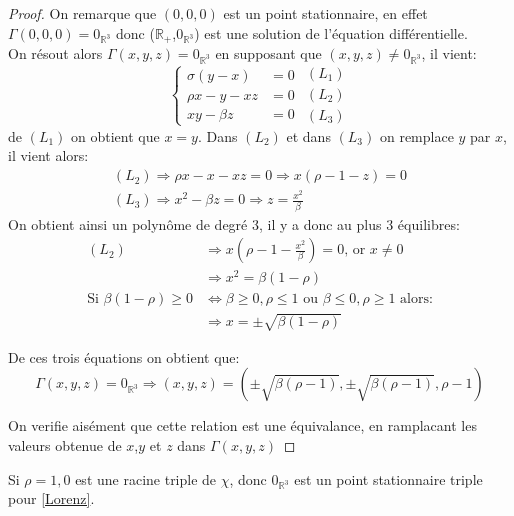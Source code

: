 \documentclass{article}
\newcommand{\R}{\mathbb{R}}
\newtheorem[M , nocut]{prop}{Proposition}[section]
\newtheorem[M , nocut]{definition}{Définition}
\newtheorem[M , nocut]{lemme}{Lemme}
\newtheorem[L , nocut]{thm}{Théoreme}
\newtheorem[M , nocut]{cor}{Corollaire}
\begin{document}
\begin{proof}
On remarque que $(0,0,0)$ est un point stationnaire, en effet $\Gamma(0,0,0) = 0_{\R^3}$ donc ($\R_+$,$0_{\R^3}$) est une solution de l'équation différentielle.\\
On résout alors $\Gamma(x,y,z)=0_{\R^3}$ en supposant que $(x,y,z) \neq 0_{\R^3}$, il vient:
\[
\left\{\begin{array}{rl} %
     \sigma(y-x)&=0  \\
     \rho x -y -xz&=0\\
     xy - \beta z&=0
\end{array}\right.
\begin{array}{c} %
    (L_1)\\
    (L_2)\\
    (L_3)
\end{array}
\]
de $(L_1)$ on obtient que $x=y$. Dans $(L_2)$ et dans $(L_3)$ on remplace $y$ par $x$, il vient alors:
\begin{gather*}
    (L_2) \Rightarrow \rho x - x - xz = 0 \Rightarrow x (\rho -1 -z ) = 0 \\
    (L_3) \Rightarrow x^2 - \beta z = 0 \Rightarrow z = \frac{x^2}{\beta}
\end{gather*}
On obtient ainsi un polynôme de degré 3, il y a donc au plus 3 équilibres:
\begin{align*}
    (L_2) & \Rightarrow x (\rho - 1 - \frac{x^2}{\beta}) = 0 \text{, or }x \neq 0\\
        & \Rightarrow x^2 = \beta (1-\rho)\\
    \text{Si } \beta(1-\rho) \ge 0 & \Leftrightarrow \beta \ge 0,\rho\le 1 \text{ ou } \beta \le 0,\rho\ge 1\text{ alors:}\\
    &\Rightarrow x = \pm \sqrt{\beta(1-\rho)}
\end{align*}

De ces trois équations on obtient que:
\[
    \Gamma(x,y,z)=0_{\R^3} \Rightarrow (x,y,z) = (\pm \sqrt{ \beta (\rho -1)} ,\pm \sqrt{\beta (\rho -1)}, \rho -1)
\]

On verifie aisément que cette relation est une \'equivalance, en ramplacant les valeurs obtenue de $x$,$y$ et $z$ dans $\Gamma(x,y,z)$
\end{proof}

\begin{example}[Remarque]
    Si $\rho=1, 0$ est une racine triple de $\chi$, donc $0_{\R^3}$ est un point stationnaire triple pour \eqref{Lorenz}.
\end{example}
\end{document}
